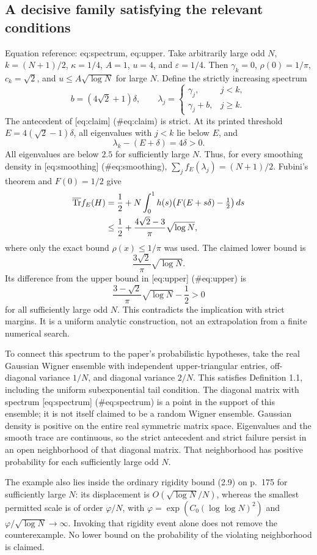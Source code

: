 \documentclass[10pt]{article}
\begin{document}
\subsection*{A decisive family satisfying the relevant conditions}
Equation reference: eq:spectrum, eq:upper. Take arbitrarily large odd \(N\), \(k=(N+1)/2\), \(\kappa=1/4\), \(A=1\), \(u=4\), and \(\varepsilon=1/4\). Then \(\gamma_k=0\), \(\rho(0)=1/\pi\), \(c_k=\sqrt2\), and \(u\leq A\sqrt{\log N}\) for large \(N\). Define the strictly increasing spectrum \[b=(4\sqrt2+1)\delta,\qquad
 \lambda_j=
 \begin{cases}
  \gamma_j,&j<k,\\
  \gamma_j+b,&j\geq k.
 \end{cases}
 \] The antecedent of [eq:claim] (\#eq:claim) is strict. At its printed threshold \(E=4(\sqrt2-1)\delta\), all eigenvalues with \(j<k\) lie below \(E\), and \[\lambda_k-(E+\delta)=4\delta>0.\] All eigenvalues are below \(2.5\) for sufficiently large \(N\). Thus, for every smoothing density in [eq:smoothing] (\#eq:smoothing), \(\sum_j f_E(\lambda_j)=(N+1)/2\). Fubini’s theorem and \(F(0)=1/2\) give \[\begin{aligned}
 \overline{\operatorname{Tr}}f_E(H)
 &=\frac12+N\int_0^1h(s)\bigl(F(E+s\delta)-\tfrac12\bigr)\,ds \notag\\
 &\leq\frac12+\frac{4\sqrt2-3}{\pi}\sqrt{\log N},
 \end{aligned}\] where only the exact bound \(\rho(x)\leq1/\pi\) was used. The claimed lower bound is \[\frac{3\sqrt2}{\pi}\sqrt{\log N}.\] Its difference from the upper bound in [eq:upper] (\#eq:upper) is \[\frac{3-\sqrt2}{\pi}\sqrt{\log N}-\frac12>0\] for all sufficiently large odd \(N\). This contradicts the implication with strict margins. It is a uniform analytic construction, not an extrapolation from a finite numerical search.\par
To connect this spectrum to the paper’s probabilistic hypotheses, take the real Gaussian Wigner ensemble with independent upper-triangular entries, off-diagonal variance \(1/N\), and diagonal variance \(2/N\). This satisfies Definition 1.1, including the uniform subexponential tail condition. The diagonal matrix with spectrum [eq:spectrum] (\#eq:spectrum) is a point in the support of this ensemble; it is not itself claimed to be a random Wigner ensemble. Gaussian density is positive on the entire real symmetric matrix space. Eigenvalues and the smooth trace are continuous, so the strict antecedent and strict failure persist in an open neighborhood of that diagonal matrix. That neighborhood has positive probability for each sufficiently large odd \(N\).\par
The example also lies inside the ordinary rigidity bound (2.9) on p. 175 for sufficiently large \(N\): its displacement is \(O(\sqrt{\log N}/N)\), whereas the smallest permitted scale is of order \(\varphi/N\), with \(\varphi=\exp(C_0(\log\log N)^2)\) and \(\varphi/\sqrt{\log N}\to\infty\). Invoking that rigidity event alone does not remove the counterexample. No lower bound on the probability of the violating neighborhood is claimed.\par
\end{document}
